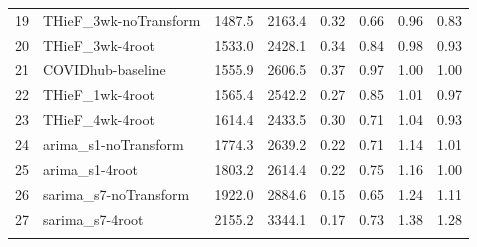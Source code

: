 \documentclass[thesis]{umassthesis}  %
\begin{document}
\begin{longtable}{llrrrrrr}
  19 & THieF\_3wk-noTransform & 1487.5 & 2163.4 & 0.32 & 0.66 & 0.96 & 0.83 \\ 
  20 & THieF\_3wk-4root & 1533.0 & 2428.1 & 0.34 & 0.84 & 0.98 & 0.93 \\ 
  21 & COVIDhub-baseline & 1555.9 & 2606.5 & 0.37 & 0.97 & 1.00 & 1.00 \\ 
  22 & THieF\_1wk-4root & 1565.4 & 2542.2 & 0.27 & 0.85 & 1.01 & 0.97 \\ 
  23 & THieF\_4wk-4root & 1614.4 & 2433.5 & 0.30 & 0.71 & 1.04 & 0.93 \\ 
  24 & arima\_s1-noTransform & 1774.3 & 2639.2 & 0.22 & 0.71 & 1.14 & 1.01 \\ 
  25 & arima\_s1-4root & 1803.2 & 2614.4 & 0.22 & 0.75 & 1.16 & 1.00 \\ 
  26 & sarima\_s7-noTransform & 1922.0 & 2884.6 & 0.15 & 0.65 & 1.24 & 1.11 \\ 
  27 & sarima\_s7-4root & 2155.2 & 3344.1 & 0.17 & 0.73 & 1.38 & 1.28 \\ 
   \hline
\hline
\label{tab:table_last17_us}
\end{longtable}
\endgroup

\newpage
\end{document}
